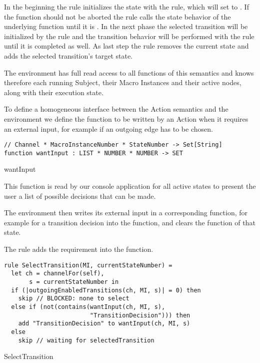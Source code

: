 In the beginning the  rule initializes the state with the
 rule, which will set  to
. If the function should not be aborted the 
rule calls the state behavior of the underlying function until it is
.
In the next phase the selected transition will be initialized by the
 rule and the transition behavior will be performed with
the  rule until it is completed as well. As last step
the  rule removes the current state and adds the selected
transition's target state.


The environment has full read access to all functions of this semantics and knows
therefore each running Subject, their Macro Instances and their active nodes,
along with their execution state.

To define a homogeneous interface between the Action semantics and the environment we
define the function  to be written by an Action when it
requires an external input, for example if an outgoing edge has to be chosen.



\begin{listing}[H]
\begin{verbatim}
// Channel * MacroInstanceNumber * StateNumber -> Set[String]
function wantInput : LIST * NUMBER * NUMBER -> SET
\end{verbatim}
\caption{wantInput}
\label{lst:shortasm:wantInput}
\end{listing}


This function is read by our console application for all active states
to present the user a list of possible decisions that can be made.

The environment then writes its external input in a corresponding function, for
example for a transition decision into the  function, and
clears the  function of that state.

The  rule adds the 
requirement into the  function.


\begin{listing}[H]
\begin{verbatim}
rule SelectTransition(MI, currentStateNumber) =
  let ch = channelFor(self),
       s = currentStateNumber in
  if (|outgoingEnabledTransitions(ch, MI, s)| = 0) then
    skip // BLOCKED: none to select
  else if (not(contains(wantInput(ch, MI, s),
                        "TransitionDecision"))) then
    add "TransitionDecision" to wantInput(ch, MI, s)
  else
    skip // waiting for selectedTransition
\end{verbatim}
\caption{SelectTransition}
\label{lst:shortasm:SelectTransition}
\end{listing}


